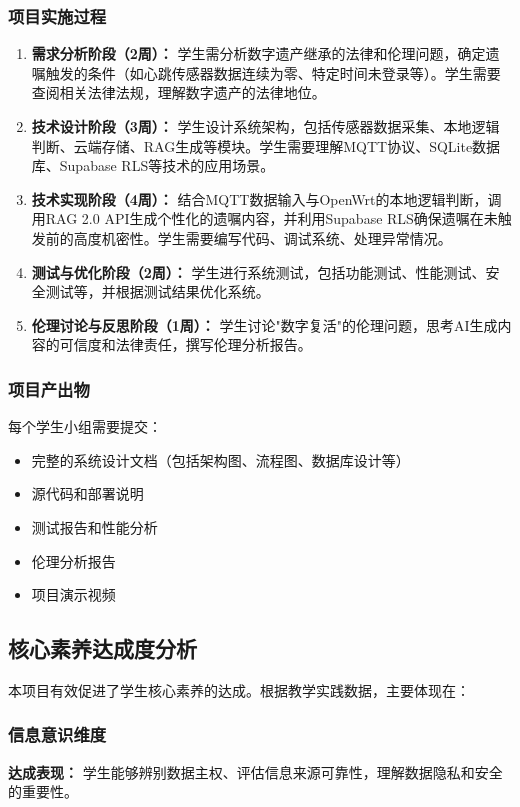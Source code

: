 \documentclass[12pt,a4paper,fontset=fandol]{ctexart}
\begin{document}
\subsubsection{项目实施过程}
\begin{enumerate}
    \item \textbf{需求分析阶段（2周）：} 学生需分析数字遗产继承的法律和伦理问题，确定遗嘱触发的条件（如心跳传感器数据连续为零、特定时间未登录等）。学生需要查阅相关法律法规，理解数字遗产的法律地位。
    
    \item \textbf{技术设计阶段（3周）：} 学生设计系统架构，包括传感器数据采集、本地逻辑判断、云端存储、RAG生成等模块。学生需要理解MQTT协议、SQLite数据库、Supabase RLS等技术的应用场景。
    
    \item \textbf{技术实现阶段（4周）：} 结合MQTT数据输入与OpenWrt的本地逻辑判断，调用RAG 2.0 API生成个性化的遗嘱内容，并利用Supabase RLS确保遗嘱在未触发前的高度机密性。学生需要编写代码、调试系统、处理异常情况。
    
    \item \textbf{测试与优化阶段（2周）：} 学生进行系统测试，包括功能测试、性能测试、安全测试等，并根据测试结果优化系统。
    
    \item \textbf{伦理讨论与反思阶段（1周）：} 学生讨论"数字复活"的伦理问题，思考AI生成内容的可信度和法律责任，撰写伦理分析报告。
\end{enumerate}

\subsubsection{项目产出物}
每个学生小组需要提交：
\begin{itemize}
    \item 完整的系统设计文档（包括架构图、流程图、数据库设计等）
    \item 源代码和部署说明
    \item 测试报告和性能分析
    \item 伦理分析报告
    \item 项目演示视频
\end{itemize}

\subsection{核心素养达成度分析}
本项目有效促进了学生核心素养的达成。根据教学实践数据，主要体现在：

\subsubsection{信息意识维度}
\textbf{达成表现：} 学生能够辨别数据主权、评估信息来源可靠性，理解数据隐私和安全的重要性。
\end{document}
